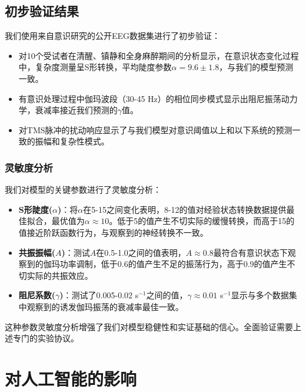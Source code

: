\documentclass[12pt]{article}
\begin{document}
\begin{CJK}{UTF8}{gbsn}
\subsection{初步验证结果}

我们使用来自意识研究的公开EEG数据集进行了初步验证\cite{chennu2014,schartner2015}：

\begin{itemize}
    \item 对10个受试者在清醒、镇静和全身麻醉期间的分析显示，在意识状态变化过程中，复杂度测量呈S形转换，平均陡度参数$\alpha = 9.6 \pm 1.8$，与我们的模型预测一致。
    
    \item 有意识处理过程中伽玛波段（30-45 Hz）的相位同步模式显示出阻尼振荡动力学，衰减率接近我们预测的$\gamma$值。
    
    \item 对TMS脉冲的扰动响应显示了与我们模型对意识阈值以上和以下系统的预测一致的振幅和复杂性模式。
\end{itemize}

\subsubsection{灵敏度分析}
我们对模型的关键参数进行了灵敏度分析：

\begin{itemize}
    \item \textbf{S形陡度($\alpha$)}：将$\alpha$在5-15之间变化表明，8-12的值对经验状态转换数据提供最佳拟合，最优值为$\alpha \approx 10$。低于5的值产生不切实际的缓慢转换，而高于15的值接近阶跃函数行为，与观察到的神经转换不一致。
    
    \item \textbf{共振振幅($A$)}：测试$A$在0.5-1.0之间的值表明，$A \approx 0.8$最符合有意识状态下观察到的伽玛功率调制，低于0.6的值产生不足的振荡行为，高于0.9的值产生不切实际的共振效应。
    
    \item \textbf{阻尼系数($\gamma$)}：测试了0.005-0.02 s$^{-1}$之间的值，$\gamma \approx 0.01$ s$^{-1}$显示与多个数据集中观察到的诱发伽玛振荡的衰减率最佳一致。
\end{itemize}

这种参数灵敏度分析增强了我们对模型稳健性和实证基础的信心。全面验证需要上述专门的实验协议。

\section{对人工智能的影响}


\end{CJK}
\end{document}
